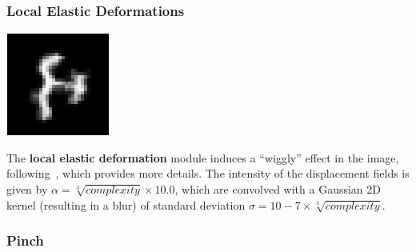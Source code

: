 \documentclass{article} %
\begin{document}
\subsubsection*{Local Elastic Deformations}

\begin{minipage}[b]{0.14\linewidth}
\begin{center}
\vspace*{5mm}
\includegraphics[scale=.4]{images/Localelasticdistorsions_only.png}
\end{center}
\end{minipage}%
\hspace{3mm}
\begin{minipage}[b]{0.85\linewidth}
The {\bf local elastic deformation}
module induces a ``wiggly'' effect in the image, following~\citet{SimardSP03-short},
which provides more details. 
The intensity of the displacement fields is given by 
$\alpha = \sqrt[3]{complexity} \times 10.0$, which are 
convolved with a Gaussian 2D kernel (resulting in a blur) of
standard deviation $\sigma = 10 - 7 \times\sqrt[3]{complexity}$.
\vspace{2mm}
\end{minipage}

\vspace*{4mm}

\subsubsection*{Pinch}
\end{document}
